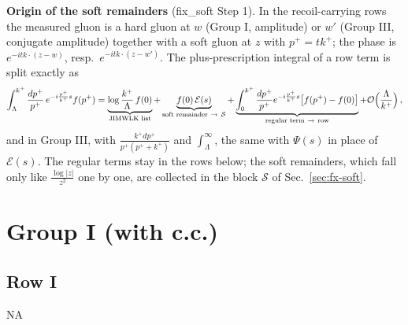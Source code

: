 \documentclass[9pt]{article}
\numberwithin{equation}{section}
\begin{document}
{\noindent\textbf{Origin of the soft remainders} (fix\_soft Step 1). In the recoil-carrying rows the measured gluon is a hard gluon at $w$ (Group I, amplitude) or $w'$ (Group III, conjugate amplitude) together with a soft gluon at $z$ with $p^{+}=tk^{+}$; the phase is $e^{-itk\cdot(z-w)}$, resp.\ $e^{-itk\cdot(z-w')}$. The plus-prescription integral of a row term is split exactly as
\begin{align}
\int_{\Lambda}^{k^{+}}\frac{dp^{+}}{p^{+}}\,e^{-i\frac{p^{+}}{k^{+}}s}f(p^{+})=\underbrace{\log\frac{k^{+}}{\Lambda}\,f(0)}_{\text{JIMWLK list}}+\underbrace{f(0)\,\mathcal{E}(s)}_{\text{soft remainder}\ \to\ \mathcal{S}}+\underbrace{\int_{0}^{k^{+}}\frac{dp^{+}}{p^{+}}e^{-i\frac{p^{+}}{k^{+}}s}\big[f(p^{+})-f(0)\big]}_{\text{regular term}\ \to\ \text{row}}+{\cal O}\Big(\frac{\Lambda}{k^{+}}\Big)\,,\label{eq:fx-split}
\end{align}
and in Group III, with $\frac{k^{+}dp^{+}}{p^{+}(p^{+}+k^{+})}$ and $\int_{\Lambda}^{\infty}$, the same with $\Psi(s)$ in place of $\mathcal{E}(s)$. The regular terms stay in the rows below; the soft remainders, which fall only like $\frac{\log|z|}{z^{2}}$ one by one, are collected in the block $\mathcal{S}$ of Sec.~\ref{sec:fx-soft}.}\par

\section{Group I (with c.c.)}
\subsection{Row I}
\textsc{NA}
\end{document}
